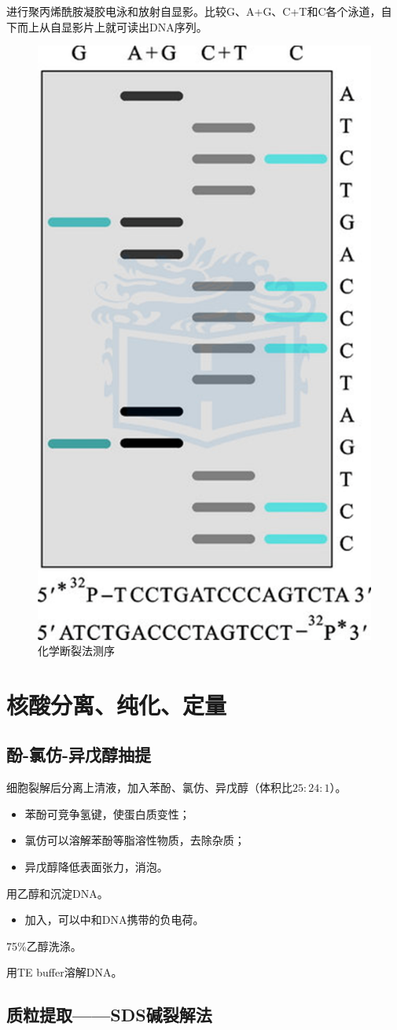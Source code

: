 进行聚丙烯酰胺凝胶电泳和放射自显影。比较G、A+G、C+T和C各个泳道，自下而上从自显影片上就可读出DNA序列。

\begin{figure}[htbp]
	\centering
	\includegraphics[width=0.3\linewidth]{Pics/化学断裂法测序}
	\caption{化学断裂法测序}
	\label{fig:MG_sequencing}
\end{figure}


\section{核酸分离、纯化、定量}

\subsection{酚-氯仿-异戊醇抽提}

细胞裂解后分离上清液，加入苯酚、氯仿、异戊醇（体积比$25:24:1$）。
\begin{itemize}
	\item 苯酚可竞争氢键，使蛋白质变性；
	\item 氯仿可以溶解苯酚等脂溶性物质，去除杂质；
	\item 异戊醇降低表面张力，消泡。
\end{itemize}

用乙醇和沉淀DNA。
\begin{itemize}
	\item 加入，可以中和DNA携带的负电荷。
\end{itemize}

75\%乙醇洗涤。

用TE buffer溶解DNA。

\subsection{质粒提取——SDS碱裂解法}

